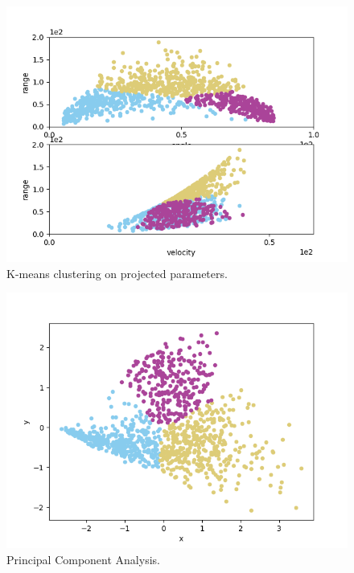  \begin{figure}[h!]
  \centering
  \includegraphics[scale=0.7]{../../tests/framework/user_guide/DataMining/gold/dataMiningAnalysis/1-PlotKMeans1_dataMining-dataMining.png}
  \caption{K-means clustering on projected parameters.}
  \label{fig:KmeanProjected}
 \end{figure}

 \begin{figure}[h!]
  \centering
  \includegraphics[scale=0.7]{../../tests/framework/user_guide/DataMining/gold/dataMiningAnalysis/1-PlotPCA1_dataMining.png}
  \caption{Principal Component Analysis.}
  \label{fig:PCAplot}
 \end{figure}

